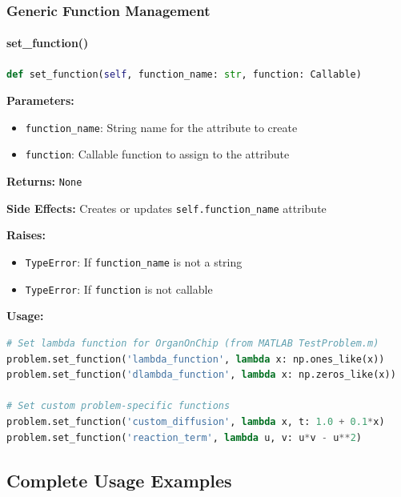 \subsubsection{Generic Function Management}

\paragraph{set\_function()}\leavevmode
\begin{lstlisting}[language=Python, caption=Set Function Method]
def set_function(self, function_name: str, function: Callable)
\end{lstlisting}

\textbf{Parameters:}
\begin{itemize}
    \item \texttt{function\_name}: String name for the attribute to create
    \item \texttt{function}: Callable function to assign to the attribute
\end{itemize}

\textbf{Returns:} \texttt{None}

\textbf{Side Effects:} Creates or updates \texttt{self.function\_name} attribute

\textbf{Raises:}
\begin{itemize}
    \item \texttt{TypeError}: If \texttt{function\_name} is not a string
    \item \texttt{TypeError}: If \texttt{function} is not callable
\end{itemize}

\textbf{Usage:}
\begin{lstlisting}[language=Python, caption=Set Function Usage]
# Set lambda function for OrganOnChip (from MATLAB TestProblem.m)
problem.set_function('lambda_function', lambda x: np.ones_like(x))
problem.set_function('dlambda_function', lambda x: np.zeros_like(x))

# Set custom problem-specific functions
problem.set_function('custom_diffusion', lambda x, t: 1.0 + 0.1*x)
problem.set_function('reaction_term', lambda u, v: u*v - u**2)
\end{lstlisting}

\subsection{Complete Usage Examples}
\label{subsec:complete_usage_examples}


